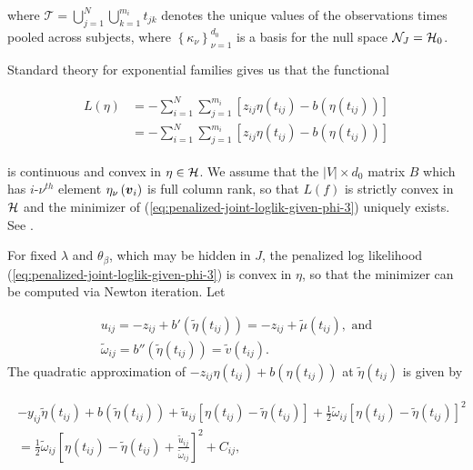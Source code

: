 \noindent
where $\mathcal{T} = \bigcup_{j=1}^N\bigcup_{k=1}^{m_i} t_{jk}$ denotes the unique values of the observations times pooled across subjects, where $\left\{\kappa_\nu \right\}_{\nu=1}^{d_0}$ is a basis for the null space $\mathcal{N}_J = \mathcal{H}_0$. 

\bigskip

Standard theory for exponential families gives us that the functional 

\begin{align}
\begin{split}
L\left( \eta \right) &= -\sum_{i=1}^N \sum_{j=1}^{m_i} \left[ z_{ij} \eta\left(t_{ij}\right) - b\left(\eta\left(t_{ij}\right)\right) \right] \\
&= -\sum_{i=1}^N \sum_{j=1}^{m_i} \left[ z_{ij} \eta\left(t_{ij}\right) - b\left(\eta\left(t_{ij}\right)\right) \right]
\end{split} \label{eq:penalized-likelihood-functional}
\end{align}

\noindent
is continuous and convex in $\eta \in \mathcal{H}$. We assume that the $\vert V \vert \times d_0$ matrix $B$ which has $i$-$\nu^{th}$ element $\eta_\nu\left(\mbox{\boldmath $v$}_i\right)$ is full column rank, so that $L\left(f\right)$ is strictly convex in $\mathcal{H}$ and the minimizer of (\ref{eq:penalized-joint-loglik-given-phi-3}) uniquely exists. See \cite{wahba1995smoothing}. 

\bigskip

For fixed $\lambda$ and $\theta_\beta$, which may be hidden in $J$, the penalized log likelihood (\ref{eq:penalized-joint-loglik-given-phi-3}) is convex in $\eta$, so that the minimizer can be computed via Newton iteration. Let 

\begin{align*}
u_{ij} = -z_{ij} + b'\left( \tilde{\eta}\left(t_{ij}\right) \right) =  -z_{ij} +  \tilde{\mu}\left(t_{ij}\right), \mbox{ and}\\
\tilde{\omega}_{ij} = b''\left( \tilde{\eta}\left(t_{ij}\right) \right) = \tilde{v}\left(t_{ij}\right).
\end{align*}
The quadratic approximation of $-z_{ij} \eta\left(t_{ij}\right) + b\left(\eta\left(t_{ij}\right)\right)$ at $\tilde{\eta}\left(t_{ij}\right)$ is given by 

\begin{align*}
\begin{split}
-y_{ij}\tilde{\eta}\left(t_{ij}\right) + b\left(\tilde{\eta}\left(t_{ij}\right)\right) + \tilde{u}_{ij} \left[  \eta\left(t_{ij}\right) - \tilde{\eta}\left(t_{ij}\right)  \right] + \frac{1}{2} \tilde{\omega}_{ij} \left[ \eta\left(t_{ij}\right) - \tilde{\eta}\left(t_{ij}\right)  \right]^2 \\
 =  \frac{1}{2} \tilde{\omega}_{ij} \left[ \eta\left(t_{ij}\right) - \tilde{\eta}\left(t_{ij}\right) + \frac{\tilde{u}_{ij}}{\tilde{\omega}_{ij}} \right]^2 + C_{ij},
 \end{split}
\end{align*}

